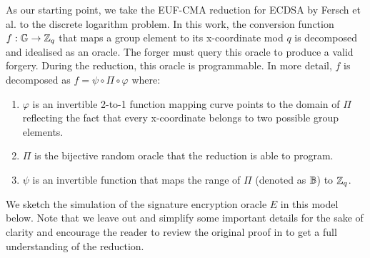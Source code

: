 \documentclass[fullpage]{article}
\theoremstyle{definition}
\newcommand{\EUFCMA}{\textsf{EUF-CMA}\xspace}
\newcommand{\G}{\mathbb{G}}
\begin{document}
As our starting point, we take the \EUFCMA reduction for ECDSA by Fersch et al.\cite{ecdsa-eufcma} to the discrete logarithm problem. In this work, the conversion function $f:\G \rightarrow \ZZ_q$ that maps a group element to its x-coordinate mod $q$ is decomposed and idealised as an oracle. The forger must query this oracle to produce a valid forgery. During the reduction, this oracle is programmable. In more detail, $f$ is decomposed as $f = \psi \circ \Pi \circ \varphi$ where:

\begin{enumerate}
    \item $\varphi$ is an invertible 2-to-1 function mapping curve points to the domain of $\Pi$ reflecting the fact that every x-coordinate belongs to two possible group elements.
    \item $\Pi$ is the bijective random oracle that the reduction is able to program.
    \item $\psi$ is an invertible function that maps the range of $\Pi$ (denoted as $\mathbb{B}$)  to $\mathbb{Z}_q$.
\end{enumerate}

We sketch the simulation of the signature encryption oracle $E$ in this model below. Note that we leave out and simplify some important details for the sake of clarity and encourage the reader to review the original proof in \cite{ecdsa-eufcma} to get a full understanding of the reduction.
\end{document}
